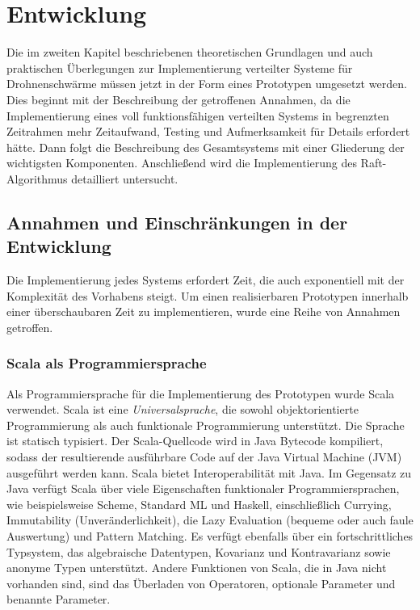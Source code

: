 \chapter{Entwicklung}
\label{cha:Entwicklung}

Die im zweiten Kapitel beschriebenen theoretischen Grundlagen und auch praktischen Überlegungen zur Implementierung verteilter Systeme für Drohnenschwärme müssen jetzt in der Form eines Prototypen umgesetzt werden. Dies beginnt mit der Beschreibung der getroffenen Annahmen, da die Implementierung eines voll funktionsfähigen verteilten Systems in begrenzten Zeitrahmen mehr Zeitaufwand, Testing und Aufmerksamkeit für Details erfordert hätte. Dann folgt die Beschreibung des Gesamtsystems mit einer Gliederung der wichtigsten Komponenten. Anschließend wird die Implementierung des Raft-Algorithmus detailliert untersucht.

\section{Annahmen und Einschränkungen in der Entwicklung}

Die Implementierung jedes Systems erfordert Zeit, die auch exponentiell mit der Komplexität des Vorhabens steigt. Um einen realisierbaren Prototypen innerhalb einer überschaubaren Zeit zu implementieren, wurde eine Reihe von Annahmen getroffen.

\subsection{Scala als Programmiersprache}

Als Programmiersprache für die Implementierung des Prototypen wurde Scala verwendet. Scala ist eine \textit{Universalsprache}, die sowohl objektorientierte Programmierung als auch funktionale Programmierung unterstützt. Die Sprache ist statisch typisiert. Der Scala-Quellcode wird in Java Bytecode kompiliert, sodass der resultierende ausführbare Code auf der Java Virtual Machine (JVM) ausgeführt werden kann. Scala bietet Interoperabilität mit Java. Im Gegensatz zu Java verfügt Scala über viele Eigenschaften funktionaler Programmiersprachen, wie beispielsweise Scheme, Standard ML und Haskell, einschließlich Currying, Immutability (Unveränderlichkeit), die Lazy Evaluation (bequeme oder auch faule Auswertung) und Pattern Matching. Es verfügt ebenfalls über ein fortschrittliches Typsystem, das algebraische Datentypen, Kovarianz und Kontravarianz sowie anonyme Typen unterstützt. Andere Funktionen von Scala, die in Java nicht vorhanden sind, sind das Überladen von Operatoren, optionale Parameter und benannte Parameter.

